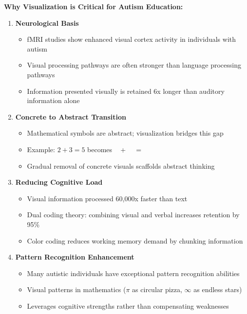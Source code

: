 \documentclass[12pt, a4paper]{article}
\begin{document}
\begin{tcolorbox}[colback=aliengreen!5, colframe=aliengreen, title=\textbf{Visualization: The Core Learning Mechanism}]

\textbf{Why Visualization is Critical for Autism Education:}

\begin{enumerate}[leftmargin=*, itemsep=10pt]
    \item \textbf{Neurological Basis}
    \begin{itemize}
        \item fMRI studies show enhanced visual cortex activity in individuals with autism
        \item Visual processing pathways are often stronger than language processing pathways
        \item Information presented visually is retained 6x longer than auditory information alone
    \end{itemize}
    
    \item \textbf{Concrete to Abstract Transition}
    \begin{itemize}
        \item Mathematical symbols are abstract; visualization bridges this gap
        \item Example: $2 + 3 = 5$ becomes 🍎🍎 + 🍎🍎🍎 = 🍎🍎🍎🍎🍎
        \item Gradual removal of concrete visuals scaffolds abstract thinking
    \end{itemize}
    
    \item \textbf{Reducing Cognitive Load}
    \begin{itemize}
        \item Visual information processed 60,000x faster than text
        \item Dual coding theory: combining visual and verbal increases retention by 95\%
        \item Color coding reduces working memory demand by chunking information
    \end{itemize}
    
    \item \textbf{Pattern Recognition Enhancement}
    \begin{itemize}
        \item Many autistic individuals have exceptional pattern recognition abilities
        \item Visual patterns in mathematics ($\pi$ as circular pizza, $\infty$ as endless stars)
        \item Leverages cognitive strengths rather than compensating weaknesses
    \end{itemize}
    

\end{enumerate}
\end{tcolorbox}
\end{document}
